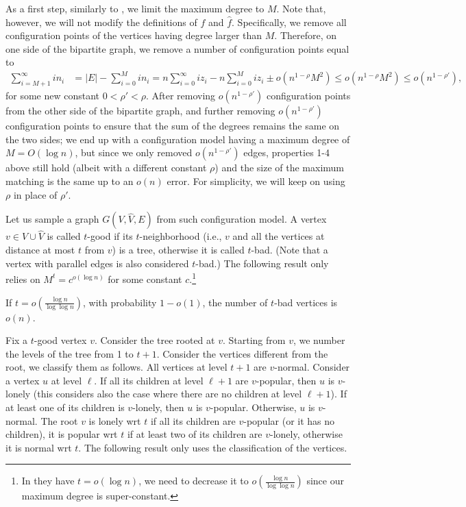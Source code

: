 \documentclass[11pt]{article}
\newcommand{\maxdeg}{M}
\begin{document}
\begin{toappendix}
As a first step, similarly to \cite{bg15}, we limit the maximum degree to $\maxdeg$. Note that, however, we will not modify the definitions of $f$ and $\hat{f}$. Specifically, we remove all configuration points of the vertices having degree larger than $\maxdeg$. Therefore, on one side of the bipartite graph, we remove a number of configuration points equal to 
\begin{align*}
\sum_{i=\maxdeg+1}^\infty i n_i &= |E| - \sum_{i=0}^\maxdeg i n_i = n\sum_{i=0}^\infty iz_i - n\sum_{i=0}^\maxdeg i z_i\pm o(n^{1-\rho} \maxdeg^2) \leq o(n^{1-\rho} \maxdeg^2) \leq o(n^{1-\rho'}),
\end{align*}
for some new constant $0<\rho'<\rho$. After removing $o(n^{1-\rho'})$ configuration points from the other side of the bipartite graph, and further removing $o(n^{1-\rho'})$ configuration points to ensure that the sum of the degrees remains the same on the two sides; we end up with a configuration model having a maximum degree of $\maxdeg=O(\log n)$, but since we only removed $o(n^{1-\rho'})$ edges, properties 1-4 above still hold (albeit with a different constant $\rho$) and the size of the maximum matching is the same up to an $o(n)$ error. For simplicity, we will keep on using $\rho$ in place of $\rho'$.

Let us sample a graph $G(V,\hat{V},E)$ from such configuration model. A vertex $v\in V\cup \hat{V}$ is called $t$-good if its $t$-neighborhood (i.e., $v$ and all the vertices at distance at most $t$ from $v$) is a tree, otherwise it is called $t$-bad. (Note that a vertex with parallel edges is also considered $t$-bad.) The following result only relies on $\maxdeg^{t} = c^{o(\log n)}$ for some constant $c$.\footnote{In \cite{bg15} they have $t=o(\log n)$, we need to decrease it to $o\left(\frac{\log n}{\log\log n}\right)$ since our maximum degree is super-constant.}

\begin{lemma}
If $t=o\left(\frac{\log n}{\log\log n}\right)$, with probability $1-o(1)$, the number of $t$-bad vertices is $o(n)$.
\end{lemma}

Fix a $t$-good vertex $v$. Consider the tree rooted at $v$. Starting from $v$, we number the levels of the tree from 1 to $t+1$. Consider the vertices different from the root, we classify them as follows. All vertices at level $t+1$ are $v$-normal. Consider a vertex $u$ at level $\ell$. If all its children at level $\ell+1$ are $v$-popular, then $u$ is $v$-lonely (this considers also the case where there are no children at level $\ell+1$). If at least one of its children is $v$-lonely, then $u$ is $v$-popular. Otherwise, $u$ is $v$-normal. The root $v$ is lonely wrt $t$ if all its children are $v$-popular (or it has no children), it is popular wrt $t$ if at least two of its children are $v$-lonely, otherwise it is normal wrt $t$. The following result only uses the classification of the vertices.


\end{toappendix}
\end{document}
